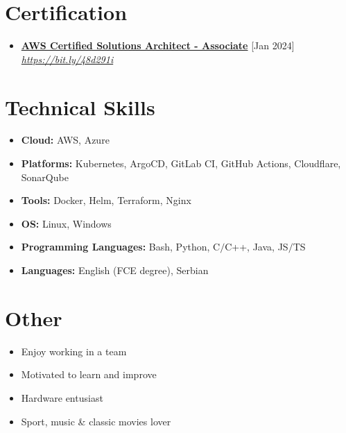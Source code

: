 \documentclass[12pt,a4paper]{moderncv}
\begin{document}
\section{Certification}

\begin{itemize}
	\item \textbf{\href{https://aws.amazon.com/certification/certified-solutions-architect-associate/}{AWS Certified Solutions Architect - Associate}} \hfill [Jan 2024]\\
	\textit{\href{https://cp.certmetrics.com/amazon/en/public/verify/credential/c546a05a82c243b895493ff0316a1e67}{https://bit.ly/48d291i}}
	
\end{itemize}


\section{Technical Skills}

\begin{itemize}
		
	\item \textbf{Cloud: } AWS, Azure
	\item \textbf{Platforms: } Kubernetes, ArgoCD, GitLab CI, GitHub Actions, Cloudflare, SonarQube
	\item \textbf{Tools: } Docker, Helm, Terraform, Nginx
	\item \textbf{OS: } Linux, Windows
	\item \textbf{Programming Languages: } Bash, Python, C$\slash$C++, Java, JS$\slash$TS
	\item \textbf{Languages: } English (FCE degree), Serbian
	
\end{itemize}

\section{Other}
	\begin{multicols*}{2}
		\begin{itemize}
			\setlength\itemsep{5pt}
			\item Enjoy working in a team
			\item Motivated to learn and improve
			\columnbreak
			\item Hardware entusiast			
			\item Sport, music \& classic movies lover
		\end{itemize}		
	\end{multicols*}

\end{document}
